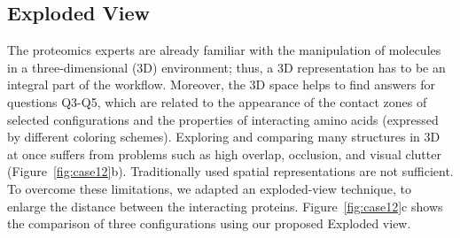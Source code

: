 \documentclass{bmcart}
\def\ExpView {Exploded view\xspace}
\def\MatView {Matrix view\xspace}
\begin{document}









\subsection*{Exploded View}
The proteomics experts are already familiar with the manipulation of molecules in a three-dimensional (3D) environment; thus, a 3D representation has to be an integral part of the workflow.
Moreover, the 3D space helps to find answers for questions Q3-Q5, which are related to the appearance of the contact zones of selected configurations and the properties of interacting amino acids (expressed by different coloring schemes).
Exploring and comparing many structures in 3D at once suffers from problems such as high overlap, occlusion, and visual clutter (Figure~\ref{fig:case12}b). 
Traditionally used spatial representations are not sufficient.
To overcome these limitations, we adapted an exploded-view technique, to enlarge the distance between the interacting proteins. 
Figure~\ref{fig:case12}c shows the comparison of three configurations using our proposed \ExpView.
\end{document}

